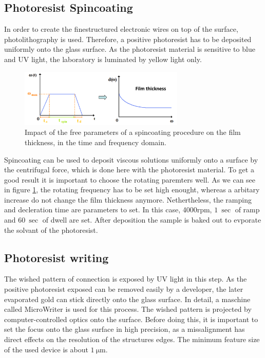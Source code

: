 \subsection{Photoresist Spincoating}
\label{sec:spincoating-resist}

In order to create the finestructured electronic wires on top of the surface, photolithography is used.
Therefore, a positive photoresist has to be deposited uniformly onto the glass surface.
As the photoresist material is sensitive to blue and UV light, the laboratory is luminated by yellow light only.

\begin{figure}
    \centering
  \includegraphics[width=0.7\textwidth]{graphics/spincoat.png}
  \caption[width=0.7\textwidth]{Impact of the free parameters of a spincoating procedure on the film thickness, in the time and frequency domain\cite{instruction}.}
  \label{fig:spincoat}
\end{figure}

Spincoating can be used to deposit viscous solutions uniformly onto a surface by the centrifugal force, which is done here with the photoresist material.
To get a good result it is important to choose the rotating paremters well.
As we can see in figure \ref{fig:spincoat}, the rotating frequency has to be set high enought, whereas a arbitary increase do not change the film thickness anymore.
Nethertheless, the ramping and decleration time are parameters to set.
In this case, 4000rpm, $\SI{1}{\sec}$ of ramp and $\SI{60}{\sec}$ of dwell are set.
After deposition the sample is baked out to evporate the solvant of the photoresist.

\subsection{Photoresist writing}
\label{sec:writing}

The wished pattern of connection is exposed by UV light in this step.
As the positive photoresist exposed can be removed easily by a developer, the later evaporated gold can stick directly onto the glass surface.
In detail, a maschine called MicroWriter is used for this process. The wished pattern is projected by computer-controlled optics onto the surface.
Before doing this, it is important to set the focus onto the glass surface in high precision, as a missalignment has direct effects on the resolution of the structures edges.
The minimum feature size of the used device is about $\SI{1}{\micro\meter}$.

